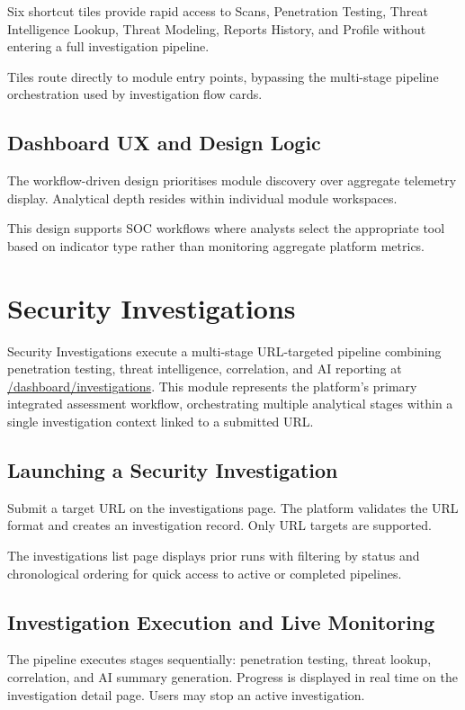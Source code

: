 Six shortcut tiles provide rapid access to Scans, Penetration Testing, Threat Intelligence Lookup, Threat Modeling, Reports History, and Profile without entering a full investigation pipeline.

Tiles route directly to module entry points, bypassing the multi-stage pipeline orchestration used by investigation flow cards.

\subsection{Dashboard UX and Design Logic}

The workflow-driven design prioritises module discovery over aggregate telemetry display. Analytical depth resides within individual module workspaces.

This design supports SOC workflows where analysts select the appropriate tool based on indicator type rather than monitoring aggregate platform metrics.

\section{Security Investigations}

Security Investigations execute a multi-stage URL-targeted pipeline combining penetration testing, threat intelligence, correlation, and AI reporting at \url{/dashboard/investigations}. This module represents the platform's primary integrated assessment workflow, orchestrating multiple analytical stages within a single investigation context linked to a submitted URL.

\subsection{Launching a Security Investigation}

Submit a target URL on the investigations page. The platform validates the URL format and creates an investigation record. Only URL targets are supported.

The investigations list page displays prior runs with filtering by status and chronological ordering for quick access to active or completed pipelines.

\subsection{Investigation Execution and Live Monitoring}

The pipeline executes stages sequentially: penetration testing, threat lookup, correlation, and AI summary generation. Progress is displayed in real time on the investigation detail page. Users may stop an active investigation.

